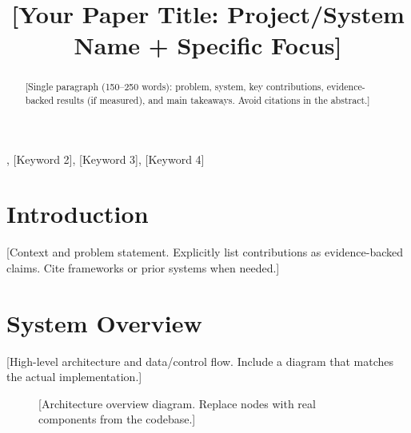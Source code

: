 \documentclass[conference]{IEEEtran}
\begin{document}
\title{[Your Paper Title: Project/System Name + Specific Focus]}

\author{
}

\maketitle

\begin{IEEEkeywords}
[Keyword 1], [Keyword 2], [Keyword 3], [Keyword 4]
\end{IEEEkeywords}

\begin{abstract}
[Single paragraph (150--250 words): problem, system, key contributions, evidence-backed results (if measured), and main takeaways. Avoid citations in the abstract.]
\end{abstract}

\section{Introduction}
[Context and problem statement. Explicitly list contributions as evidence-backed claims. Cite frameworks or prior systems when needed.]

\section{System Overview}
[High-level architecture and data/control flow. Include a diagram that matches the actual implementation.]

\begin{figure}[t]
    \centering
    \caption{[Architecture overview diagram. Replace nodes with real components from the codebase.]}
    \label{fig:arch}
\end{figure}
\end{document}
